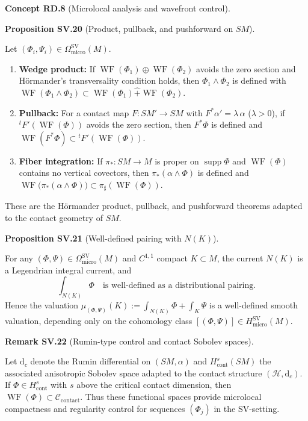 \documentclass[10pt, letterpaper]{article}
\DeclareMathOperator{\WF}{WF}
\newcommand{\CustomHeading}[3]{%
  \par\medskip\noindent%
  \textbf{#1 #2} \textnormal{(#3)}.\enskip%
}
\newenvironment{PROP}[2]{\begin{unitbox}\CustomHeading{Proposition}{#1}{#2}}{\end{unitbox}}
\newenvironment{REM}[2]{\begin{unitbox}\CustomHeading{Remark}{#1}{#2}}{\end{unitbox}}
\newenvironment{CONC}[2]{\begin{unitbox}\CustomHeading{Concept}{#1}{#2}}{\end{unitbox}}
\begin{document}
\begin{CONC}{RD.8}{Microlocal analysis and wavefront control}
\begin{PROP}{SV.20}{Product, pullback, and pushforward on $SM$}
Let $(\Phi_i,\Psi_i)\in\Omega^{\operatorname{SV}}_{\mathrm{micro}}(M)$.
\begin{enumerate}[label=(\roman*)]
\item \textbf{Wedge product:} If $\WF(\Phi_1)\oplus\WF(\Phi_2)$ avoids the zero section and Hörmander’s transversality condition holds,
then $\Phi_1\wedge\Phi_2$ is defined with
$\WF(\Phi_1\wedge\Phi_2)\subset \WF(\Phi_1)\widehat{+}\WF(\Phi_2)$.
\item \textbf{Pullback:} For a contact map $F:SM'\to SM$ with $F^*\alpha'=\lambda\,\alpha$ ($\lambda>0$),
if ${}^tF'(\WF(\Phi))$ avoids the zero section, then $F^*\Phi$ is defined and
$\WF(F^*\Phi)\subset {}^tF'(\WF(\Phi))$.
\item \textbf{Fiber integration:} If $\pi_*:SM\to M$ is proper on $\operatorname{supp}\Phi$ and $\WF(\Phi)$ contains no vertical covectors,
then $\pi_*(\alpha\wedge\Phi)$ is defined and
$\WF\!\big(\pi_*(\alpha\wedge\Phi)\big)\subset \pi_\sharp(\WF(\Phi))$.
\end{enumerate}
These are the Hörmander product, pullback, and pushforward theorems adapted to the contact geometry of $SM$.
\end{PROP}

\begin{PROP}{SV.21}{Well-defined pairing with $N(K)$}
For any $(\Phi,\Psi)\in\Omega^{\operatorname{SV}}_{\mathrm{micro}}(M)$ and $C^{1,1}$ compact $K\subset M$,
the current $N(K)$ is a Legendrian integral current, and
\[
\int_{N(K)}\Phi
\quad\text{is well-defined as a distributional pairing.}
\]
Hence the valuation $\mu_{(\Phi,\Psi)}(K):=\int_{N(K)}\Phi+\int_K\Psi$
is a well-defined smooth valuation,
depending only on the cohomology class $[(\Phi,\Psi)]\in H^{\operatorname{SV}}_{\mathrm{micro}}(M)$.
\end{PROP}

\begin{REM}{SV.22}{Rumin-type control and contact Sobolev spaces}
Let $\mathrm d_c$ denote the Rumin differential on $(SM,\alpha)$
and $H^s_{\mathrm{cont}}(SM)$ the associated anisotropic Sobolev space adapted to the contact structure $(\mathcal H,\mathrm d_c)$.
If $\Phi\in H^s_{\mathrm{cont}}$ with $s$ above the critical contact dimension, then $\WF(\Phi)\subset\mathcal C_{\mathrm{contact}}$.
Thus these functional spaces provide microlocal compactness and regularity control for sequences $(\Phi_j)$ in the SV-setting.
\end{REM}


\end{CONC}
\end{document}
